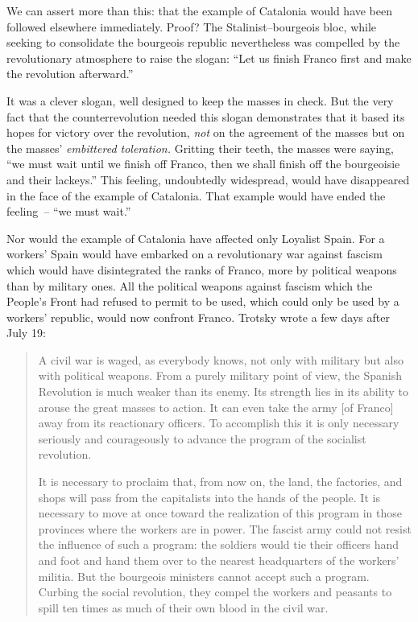 We can assert more than this: that the example of Catalonia would have been followed elsewhere immediately. Proof? The Stalinist--bourgeois bloc, while seeking to consolidate the bourgeois republic nevertheless was compelled by the revolutionary atmosphere to raise the slogan: ``Let us finish Franco first and make the revolution afterward.''

It was a clever slogan, well designed to keep the masses in check. But the very fact that the counterrevolution needed this slogan demonstrates that it based its hopes for victory over the revolution, \emph{not} on the agreement of the masses but on the masses’ \emph{embittered toleration.} Gritting their teeth, the masses were saying, ``we must wait until we finish off Franco, then we shall finish off the bourgeoisie and their lackeys.'' This feeling, undoubtedly widespread, would have disappeared in the face of the example of Catalonia. That example would have ended the feeling~-- ``we must wait.''

Nor would the example of Catalonia have affected only Loyalist Spain. For a workers’ Spain would have embarked on a revolutionary war against fascism which would have disintegrated the ranks of Franco, more by political weapons than by military ones. All the political weapons against fascism which the People’s Front had refused to permit to be used, which could only be used by a workers’ republic, would now confront Franco. Trotsky wrote a few days after July 19:

\begin{quotation}
  A civil war is waged, as everybody knows, not only with military but also with political weapons. From a purely military point of view, the Spanish Revolution is much weaker than its enemy. Its strength lies in its ability to arouse the great masses to action. It can even take the army [of Franco] away from its reactionary officers. To accomplish this it is only necessary seriously and courageously to advance the program of the socialist revolution.

  It is necessary to proclaim that, from now on, the land, the factories, and shops will pass from the capitalists into the hands of the people. It is necessary to move at once toward the realization of this program in those provinces where the workers are in power. The fascist army could not resist the influence of such a program: the soldiers would tie their officers hand and foot and hand them over to the nearest headquarters of the workers’ militia. But the bourgeois ministers cannot accept such a program. Curbing the social revolution, they compel the workers and peasants to spill ten times as much of their own blood in the civil war.
\end{quotation}


